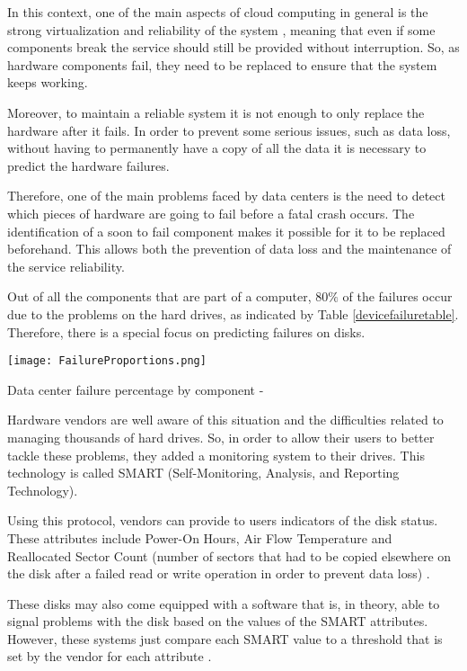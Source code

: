 In this context, one of the main aspects of cloud computing in general is the strong virtualization and reliability of the system \cite{Qian09}, meaning that even if some components break the service should still be provided without interruption.
So, as hardware components fail, they need to be replaced to ensure that the system keeps working.

Moreover, to maintain a reliable system it is not enough to only replace the hardware after it fails.
In order to prevent some serious issues, such as data loss, without having to permanently have a copy of all the data it is necessary to predict the hardware failures.

Therefore, one of the main problems faced by data centers is the need to detect which pieces of hardware are going to fail before a fatal crash occurs.
The identification of a soon to fail component makes it possible for it to be replaced beforehand.
This allows both the prevention of data loss and the maintenance of the service reliability.

Out of all the components that are part of a computer, $80\%$ of the failures occur due to the problems on the hard drives, as indicated by Table \ref{devicefailuretable}.
Therefore, there is a special focus on predicting failures on disks.

\begin{table}
    \begin{center}
      \texttt{[image: FailureProportions.png]}
      \caption[Failure percentage by component]{Data center failure percentage by component - \cite{Wang17}}
      \label{devicefailuretable}
    \end{center}
  \end{table}

Hardware vendors are well aware of this situation and the difficulties related to managing thousands of hard drives.
So, in order to allow their users to better tackle these problems, they added a monitoring system to their drives.
This technology is called SMART (Self-Monitoring, Analysis, and Reporting Technology).

Using this protocol, vendors can provide to users indicators of the disk status.
These attributes include Power-On Hours, Air Flow Temperature and Reallocated Sector Count (number of sectors that had to be copied elsewhere on the disk after a failed read or write operation in order to prevent data loss) \cite{SamsungSSD}.

These disks may also come equipped with a software that is, in theory, able to signal problems with the disk based on the values of the SMART attributes.
However, these systems just compare each SMART value to a threshold that is set by the vendor for each attribute \cite{SamsungSSD}.

